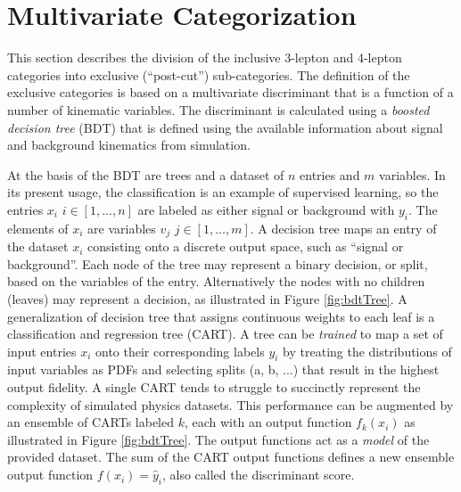 \section{Multivariate Categorization}\label{sec:hmmBdt}

This section describes the division of the inclusive 3-lepton and 4-lepton categories into exclusive (``post-cut'') sub-categories.
The definition of the exclusive categories is based on a multivariate discriminant that is a function of a number of kinematic variables.
The discriminant is calculated using a \emph{boosted decision tree} (BDT) that is defined using the available information about signal and background kinematics from simulation.

\begin{figure}[h!]
\captionsetup[subfigure]{position=b}
\centering
{}
\caption{}
\label{fig:}
\end{figure}

At the basis of the BDT are trees and a dataset of $n$ entries and $m$ variables.
In its present usage, the classification is an example of supervised learning, so the entries $x_i$ $i\in[1,...,n]$ are labeled as either signal or background with $y_i$.
The elements of $x_i$ are variables $v_j$ $j\in[1,...,m]$.
A decision tree maps an entry of the dataset $x_i$ consisting onto a discrete output space, such as ``signal or background''.
Each node of the tree may represent a binary decision, or split, based on the variables of the entry.
Alternatively the nodes with no children (leaves) may represent a decision, as illustrated in Figure \ref{fig:bdtTree}.
A generalization of decision tree that assigns continuous weights to each leaf is a classification and regression tree (CART).
A tree can be \emph{trained} to map a set of input entries $x_i$ onto their corresponding labels $y_i$ by treating the distributions of input variables as PDFs and selecting splits (a, b, ...) that result in the highest output fidelity.
A single CART tends to struggle to succinctly represent the complexity of simulated physics datasets.
This performance can be augmented by an ensemble of CARTs labeled $k$, each with an output function $f_k(x_i)$ as illustrated in Figure \ref{fig:bdtTree}.
The output functions act as a \emph{model} of the provided dataset.
The sum of the CART output functions defines a new ensemble output function $f(x_i)=\hat{y}_i$, also called the discriminant score.

